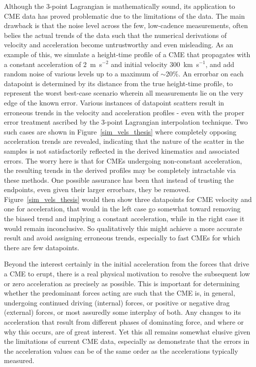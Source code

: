 \documentclass[structabstract]{aa}
\begin{document}
Although the 3-point Lagrangian is mathematically sound, its application to CME data has proved problematic due to the limitations of the data. The main drawback is that the noise level across the few, low-cadence measurements, often belies the actual trends of the data such that the numerical derivations of velocity and acceleration become untrustworthy and even misleading. As an example of this, we simulate a height-time profile of a CME that propagates with a constant acceleration of 2~m~s$^{-2}$ and initial velocity 300~km~s$^{-1}$, and add random noise of various levels up to a maximum of $\sim$20\%. An errorbar on each datapoint is determined by its distance from the true height-time profile, to represent the worst best-case scenario wherein all measurements lie on the very edge of the known error. Various instances of datapoint scatters result in erroneous trends in the velocity and acceleration profiles - even with the proper error treatment ascribed by the 3-point Lagrangian interpolation technique. Two such cases are shown in Figure~\ref{sim_vels_thesis} where completely opposing acceleration trends are revealed, indicating that the nature of the scatter in the samples is not satisfactorily reflected in the derived kinematics and associated errors. The worry here is that for CMEs undergoing non-constant acceleration, the resulting trends in the derived profiles may be completely intractable via these methods. One possible assurance has been that instead of trusting the endpoints, even given their larger errorbars, they be removed. Figure~\ref{sim_vels_thesis} would then show three datapoints for CME velocity and one for acceleration, that would in the left case go somewhat toward removing the biased trend and implying a constant acceleration, while in the right case it would remain inconclusive. So qualitatively this might achieve a more accurate result and avoid assigning erroneous trends, especially to fast CMEs for which there are few datapoints.

Beyond the interest certainly in the initial acceleration from the forces that drive a CME to erupt, there is a real physical motivation to resolve the subsequent low or zero acceleration as precisely as possible. This is important for determining whether the predominant forces acting are such that the CME is, in general, undergoing continued driving (internal) forces, or positive or negative drag (external) forces, or most assuredly some interplay of both. Any changes to its acceleration that result from different phases of dominating force, and where or why this occurs, are of great interest. Yet this all remains somewhat elusive given the limitations of current CME data, especially as \citet{2007ApJ...657.1117W} demonstrate that the errors in the acceleration values can be of the same order as the accelerations typically measured. 
\end{document}
